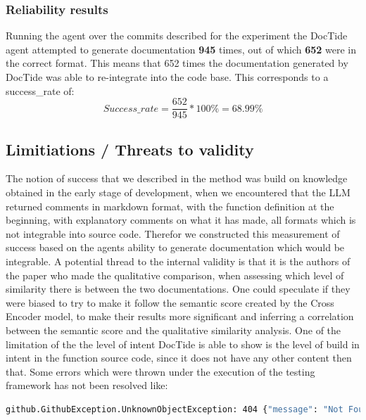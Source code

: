 \subsubsection{Reliability results}
\label{sec:suc_results}
Running the agent over the commits described for the experiment the DocTide agent attempted to generate documentation \textbf{945} times, out of which \textbf{652} were in the correct format. This means that 652 times the documentation generated by DocTide was able to re-integrate into the code base. This corresponds to a success\_rate of:
\[
Success\_rate=\frac{652}{945}*100\% = 68.99\%
\]

\subsection{Limitiations / Threats to validity}
The notion of success that we described in the method  was build on knowledge obtained in the early stage of development, when we encountered that the LLM returned comments in markdown format, with the function definition at the beginning, with explanatory comments on what it has made, all formats which is not integrable into source code. Therefor we constructed this measurement of success based on the agents ability to generate documentation which would be integrable.
A potential thread to the internal validity is that it is the authors of the paper who made the qualitative comparison, when assessing which level of similarity there is between the two documentations. One could speculate if they were biased to try to make it follow the semantic score created by the Cross Encoder model, to make their results more significant and inferring a correlation between the semantic score and the qualitative similarity analysis. One of the limitation of the the level of intent DocTide is able to show is the level of build in intent in the function source code, since it does not have any other content then that. Some errors which were thrown under the execution of the testing framework has not been resolved like:
\begin{lstlisting}[language=bash, label={lst:unresolved_errors}, caption=Unresloved errors ]
    github.GithubException.UnknownObjectException: 404 {"message": "Not Found", "documentation_url": "https://docs.github.com/rest/repos/contents#get-repository-content", "status": "404"}
\end{lstlisting}

